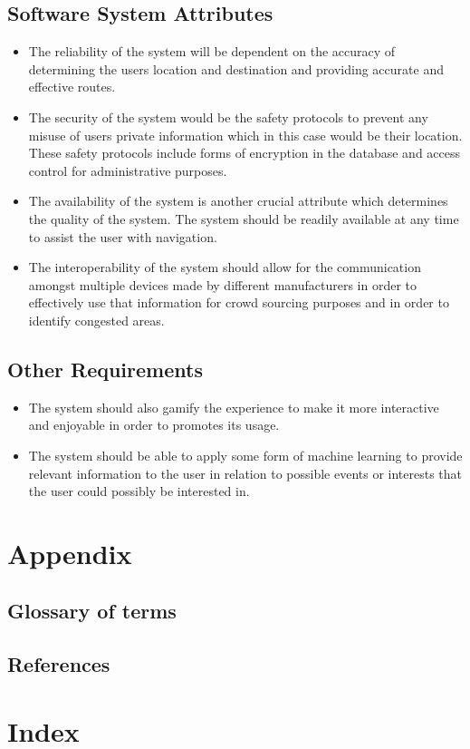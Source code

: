 \documentclass[a4paper,12pt]{article}
\begin{document}
\subsection{Software System Attributes}
\begin{itemize}
\small
\item The reliability of the system will be dependent on the accuracy of determining the users location and destination and providing accurate and effective routes.
\item The security of the system would be the safety protocols to prevent any misuse of users private information which in this case would be their location. These safety protocols include forms of encryption in the database and access control for administrative purposes.
\item The availability of the system is another crucial attribute which determines the quality of the system. The system should be readily available at any time to assist the user with navigation. 
\item The interoperability of the system should allow for the communication amongst multiple devices made by different manufacturers in order to effectively use that information for crowd sourcing purposes and in order to identify congested areas.
\end{itemize}
\subsection{Other Requirements}
\begin{itemize}
\small
\item The system should also gamify the experience to make it more interactive and enjoyable in order to promotes its usage.
\item The system should be able to apply some form of machine learning to provide relevant information to the user in relation to possible events or interests that the user could possibly be interested in.
\end{itemize}
\section{Appendix}
\subsection{Glossary of terms}
\subsection{References}
\section{Index}
\end{document}
